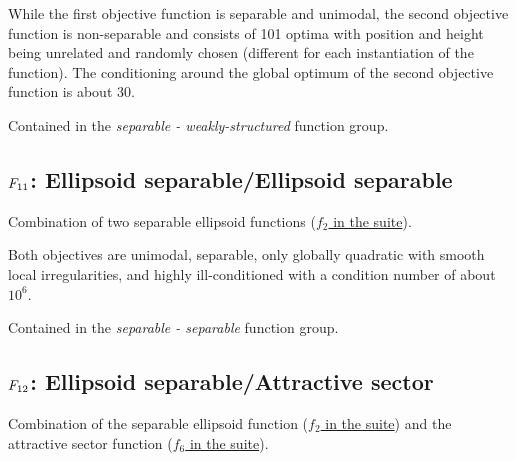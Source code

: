 While the first objective function is separable and unimodal,
the second objective function is non-separable and consists
of 101 optima with position and height being unrelated and
randomly chosen (different for each instantiation of the function).
The conditioning around the global optimum of the second
objective function is about 30.

Contained in the \emph{separable - weakly-structured} function group.



\subsection[\texorpdfstring{\protect\(F_{11}\protect\): Ellipsoid separable/Ellipsoid separable}{F11: Ellipsoid separable/Ellipsoid separable}]{\texorpdfstring{\protect\(F_{11}\protect\): Ellipsoid separable/Ellipsoid separable}{}}
\label{index:ellipsoid-separable-ellipsoid-separable}\label{index:f11}
Combination of two separable ellipsoid functions (\href{https://coco.gforge.inria.fr/downloads/download16.00/bbobdocfunctions.pdf\#page=10}{\(f_2\) in the \bbob suite}).

Both objectives are unimodal, separable, only globally
quadratic with smooth local irregularities, and highly
ill-conditioned with a condition number of
about \(10^6\).

Contained in the \emph{separable - separable} function group.



\subsection[\texorpdfstring{\protect\(F_{12}\protect\): Ellipsoid separable/Attractive sector}{F12: Ellipsoid separable/Attractive sector}]{\texorpdfstring{\protect\(F_{12}\protect\): Ellipsoid separable/Attractive sector}{}}
\label{index:f12}\label{index:ellipsoid-separable-attractive-sector}
Combination of the separable ellipsoid function (\href{https://coco.gforge.inria.fr/downloads/download16.00/bbobdocfunctions.pdf\#page=10}{\(f_2\) in the \bbob suite})
and the attractive sector function (\href{https://coco.gforge.inria.fr/downloads/download16.00/bbobdocfunctions.pdf\#page=30}{\(f_6\) in the \bbob suite}).

